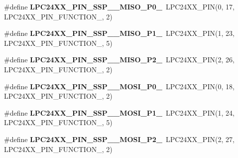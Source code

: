 \begin{DoxyCompactItemize}
\item 
\mbox{\label{group__lpc24xx__io_ga5381cca8b6894cda42dd6756c6de96b1}} 
\#define {\bfseries L\+P\+C24\+X\+X\+\_\+\+P\+I\+N\+\_\+\+S\+S\+P\+\_\+\_\+\+M\+I\+S\+O\+\_\+\+P0\+\_}~L\+P\+C24\+X\+X\+\_\+\+P\+IN(0, 17, L\+P\+C24\+X\+X\+\_\+\+P\+I\+N\+\_\+\+F\+U\+N\+C\+T\+I\+O\+N\+\_, 2)
\item 
\mbox{\label{group__lpc24xx__io_ga950daa00abaf51e957b9baefb0a77664}} 
\#define {\bfseries L\+P\+C24\+X\+X\+\_\+\+P\+I\+N\+\_\+\+S\+S\+P\+\_\+\_\+\+M\+I\+S\+O\+\_\+\+P1\+\_}~L\+P\+C24\+X\+X\+\_\+\+P\+IN(1, 23, L\+P\+C24\+X\+X\+\_\+\+P\+I\+N\+\_\+\+F\+U\+N\+C\+T\+I\+O\+N\+\_, 5)
\item 
\mbox{\label{group__lpc24xx__io_ga24802ed65988f5855f8fb5dc3823a402}} 
\#define {\bfseries L\+P\+C24\+X\+X\+\_\+\+P\+I\+N\+\_\+\+S\+S\+P\+\_\+\_\+\+M\+I\+S\+O\+\_\+\+P2\+\_}~L\+P\+C24\+X\+X\+\_\+\+P\+IN(2, 26, L\+P\+C24\+X\+X\+\_\+\+P\+I\+N\+\_\+\+F\+U\+N\+C\+T\+I\+O\+N\+\_, 2)
\item 
\mbox{\label{group__lpc24xx__io_ga226663efdbf0abf9fbf336b3ba545990}} 
\#define {\bfseries L\+P\+C24\+X\+X\+\_\+\+P\+I\+N\+\_\+\+S\+S\+P\+\_\+\_\+\+M\+O\+S\+I\+\_\+\+P0\+\_}~L\+P\+C24\+X\+X\+\_\+\+P\+IN(0, 18, L\+P\+C24\+X\+X\+\_\+\+P\+I\+N\+\_\+\+F\+U\+N\+C\+T\+I\+O\+N\+\_, 2)
\item 
\mbox{\label{group__lpc24xx__io_gaab2491a0756ffd05a139a1fe1ef00b3c}} 
\#define {\bfseries L\+P\+C24\+X\+X\+\_\+\+P\+I\+N\+\_\+\+S\+S\+P\+\_\+\_\+\+M\+O\+S\+I\+\_\+\+P1\+\_}~L\+P\+C24\+X\+X\+\_\+\+P\+IN(1, 24, L\+P\+C24\+X\+X\+\_\+\+P\+I\+N\+\_\+\+F\+U\+N\+C\+T\+I\+O\+N\+\_, 5)
\item 
\mbox{\label{group__lpc24xx__io_ga900994282e4224e8b0e5f930dbb65834}} 
\#define {\bfseries L\+P\+C24\+X\+X\+\_\+\+P\+I\+N\+\_\+\+S\+S\+P\+\_\+\_\+\+M\+O\+S\+I\+\_\+\+P2\+\_}~L\+P\+C24\+X\+X\+\_\+\+P\+IN(2, 27, L\+P\+C24\+X\+X\+\_\+\+P\+I\+N\+\_\+\+F\+U\+N\+C\+T\+I\+O\+N\+\_, 2)
\end{DoxyCompactItemize}
